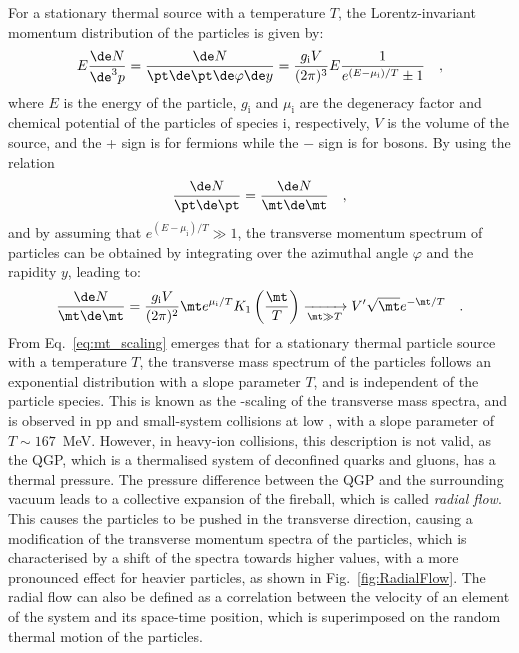 For a stationary thermal source with a temperature $T$, the Lorentz-invariant momentum distribution of the particles is given by:
\begin{equation*}
    E\frac{\de N}{\de^3p} = \frac{\de N}{\pt\de\pt\de\varphi\de y} = \frac{g_\mathrm{i}V}{(2\pi)^3} E \frac{1}{e^{(E-\mu_\mathrm{i})/T}\pm1}\quad ,
\end{equation*}
where $E$ is the energy of the particle, $g_\mathrm{i}$ and $\mu_\mathrm{i}$ are the degeneracy factor and chemical potential of the particles of species i, respectively, $V$ is the volume of the source, and the + sign is for fermions while the $-$ sign is for bosons. By using the relation
\begin{equation*}
  \frac{\de N}{\pt\de\pt} = \frac{\de N}{\mt\de\mt}\quad ,
\end{equation*}
and by assuming that $e^{(E-\mu_\mathrm{i})/T}\gg1$, the transverse momentum spectrum of particles can be obtained by integrating over the azimuthal angle $\varphi$ and the rapidity $y$, leading to:
\begin{equation}\label{eq:mt_scaling}
    \frac{\de N}{\mt\de\mt} = \frac{g_\mathrm{i}V}{(2\pi)^2} \mt e^{\mu_\mathrm{i}/T} K_1\left(\frac{\mt}{T}\right) \xrightarrow[\mt\gg T]{} V'\sqrt{\mt}e^{-\mt/T}\quad .
\end{equation}
From Eq.~\ref{eq:mt_scaling} emerges that for a stationary thermal particle source with a temperature $T$, the transverse mass spectrum of the particles follows an exponential distribution with a slope parameter $T$, and is independent of the particle species. This is known as the \mt-scaling of the transverse mass spectra, and is observed in pp and small-system collisions at low \sqs, with a slope parameter of $T\sim167$~MeV. However, in heavy-ion collisions, this description is not valid, as the QGP, which is a thermalised system of deconfined quarks and gluons, has a thermal pressure. The pressure difference between the QGP and the surrounding vacuum leads to a collective expansion of the fireball, which is called \emph{radial flow}. This causes the particles to be pushed in the transverse direction, causing a modification of the transverse momentum spectra of the particles, which is characterised by a shift of the spectra towards higher \pt values, with a more pronounced effect for heavier particles, as shown in Fig.~\ref{fig:RadialFlow}. The radial flow can also be defined as a correlation between the velocity of an element of the system and its space-time position, which is superimposed on the random thermal motion of the particles.

